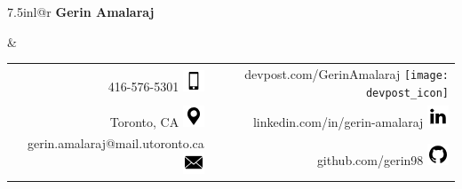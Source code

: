 \documentclass[letterpaper,11pt]{article}
\begin{document}
\begin{tabular*}{7.5in}{l@{\extracolsep{\fill}}r}
\textbf{
	\large Gerin Amalaraj}  

 & 
    \setlength{\tabcolsep}{20pt}
    \begin{tabular}[t]
    {r r}
    
 416-576-5301 \includegraphics[scale=1]{phone} & devpost.com/GerinAmalaraj \texttt{[image: devpost\_icon]} \\ 
 
 Toronto, CA  \includegraphics[scale=1]{gps}  &  linkedin.com/in/gerin-amalaraj
 														\includegraphics[scale=1]{linkedin} \\  
 gerin.amalaraj@mail.utoronto.ca
    											        \includegraphics[scale=1]{mail}          & 
 github.com/gerin98
                                               \includegraphics[scale=1]{github}    
\end{tabular}
 
\end{tabular*}
\\
\end{document}
